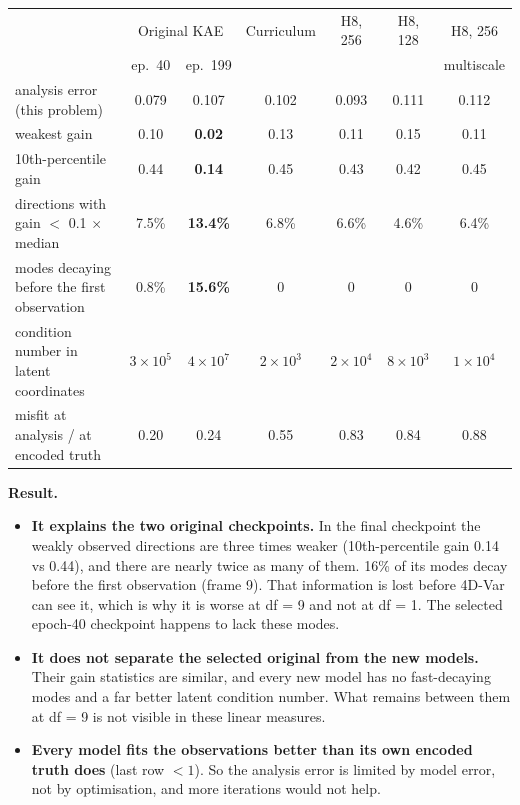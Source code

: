 \begin{center}\footnotesize
\begin{tabular}{lcccccc}
\toprule
 & \multicolumn{2}{c}{Original KAE} & Curriculum & H8, 256 & H8, 128 & H8, 256\\
 & ep.\ 40 & ep.\ 199 & & & & multiscale\\
\midrule
analysis error (this problem)              & 0.079 & 0.107 & 0.102 & 0.093 & 0.111 & 0.112\\
weakest gain                               & 0.10 & \textbf{0.02} & 0.13 & 0.11 & 0.15 & 0.11\\
10th-percentile gain                       & 0.44 & \textbf{0.14} & 0.45 & 0.43 & 0.42 & 0.45\\
directions with gain $<$ 0.1 $\times$ median & 7.5\% & \textbf{13.4\%} & 6.8\% & 6.6\% & 4.6\% & 6.4\%\\
modes decaying before the first observation & 0.8\% & \textbf{15.6\%} & 0 & 0 & 0 & 0\\
condition number in latent coordinates     & $3\times10^5$ & $4\times10^7$ & $2\times10^3$ & $2\times10^4$ & $8\times10^3$ & $1\times10^4$\\
misfit at analysis / at encoded truth      & 0.20 & 0.24 & 0.55 & 0.83 & 0.84 & 0.88\\
\bottomrule
\end{tabular}
\end{center}

\textbf{Result.}
\begin{itemize}
\item \textbf{It explains the two original checkpoints.} In the final checkpoint the weakly
  observed directions are three times weaker (10th-percentile gain 0.14 vs 0.44), and there
  are nearly twice as many of them. 16\% of its modes decay before the first observation
  (frame 9). That information is lost before 4D-Var can see it, which is why it
  is worse at df = 9 and not at df = 1. The selected epoch-40 checkpoint happens to lack
  these modes.
\item \textbf{It does not separate the selected original from the new models.} Their gain
  statistics are similar, and every new model has no fast-decaying modes and a far better
  latent condition number. What remains between them at df = 9 is not visible in these
  linear measures.
\item \textbf{Every model fits the observations better than its own encoded truth does} (last
  row $<1$). So the analysis error is limited by model error, not by optimisation, and more
  iterations would not help.
\end{itemize}

